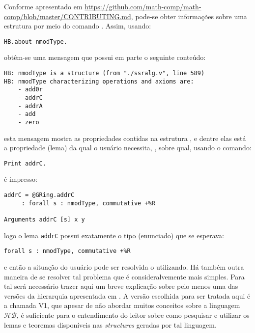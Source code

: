 {{Conforme apresentado em \url{https://github.com/math-comp/math-comp/blob/master/CONTRIBUTING.md}, pode-se obter informações sobre uma estrutura por meio do comando . Assim, usando:
    \begin{lstlisting}[language=coq,frame=single,tabsize=1]
HB.about nmodType.
    \end{lstlisting}
obtêm-se uma mensagem que possui em parte o seguinte conteúdo:
    \begin{lstlisting}[language=coq-error,frame=single,tabsize=1]
HB: nmodType is a structure (from "./ssralg.v", line 589)
HB: nmodType characterizing operations and axioms are:
    - add0r
    - addrC
    - addrA
    - add
    - zero
    \end{lstlisting}
esta mensagem mostra as propriedades contidas na estrutura , e dentre elas está a propriedade (lema) da qual o usuário necessita, , sobre qual, usando o comando:
    \begin{lstlisting}[language=coq,frame=single,tabsize=1]
Print addrC.
    \end{lstlisting}
é impresso:
    \begin{lstlisting}[language=coq-error,frame=single,tabsize=1]
addrC = @GRing.addrC
     : forall s : nmodType, commutative +%R

Arguments addrC [s] x y
    \end{lstlisting}
logo o lema \lstinline[language = coq]!addrC! possui exatamente o tipo (enunciado) que se esperava:
    \begin{lstlisting}[language=coq,frame=single,tabsize=1]
forall s : nmodType, commutative +%R
    \end{lstlisting}
e então a situação do usuário pode ser resolvida o utilizando. 
Há também outra maneira de se resolver tal problema que é consideralvemente mais simples. Para tal será necessário trazer aqui um breve explicação sobre pelo menos uma das versões da hierarquia apresentada em \cite{cohen:hal-02478907}. A versão escolhida para ser tratada aqui é a chamada V1, que apesar de não abordar muitos conceitos sobre a linguagem $\mathcal{HB}$, é suficiente para o entendimento do leitor sobre como pesquisar e utilizar os lemas e teoremas disponíveis nas \textit{structures} geradas por tal linguagem.

}}
